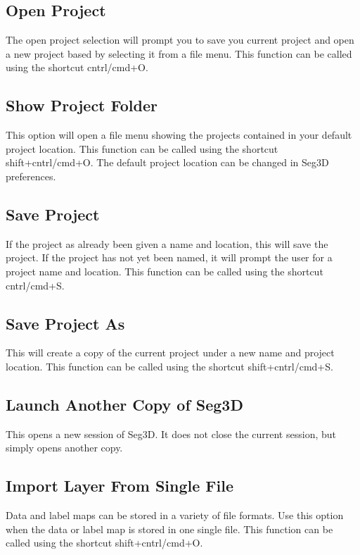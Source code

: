 \documentclass[fleqn,11pt,openany]{book}
\begin{document}
\subsection{Open Project}
\label{sec:openproject}
The open project selection will prompt you to save you current project and open a new project based by selecting it from a file menu.  This function can be called using the shortcut cntrl/cmd+O.

\subsection{Show Project Folder}
This option will open a file menu showing the projects contained in your default project location.  This function can be called using the shortcut shift+cntrl/cmd+O.  The default project location can be changed in Seg3D preferences.

\subsection{Save Project}
If the project as already been given a name and location, this will save the project.  If the project has not yet been named, it will prompt the user for a project name and location.  This function can be called using the shortcut cntrl/cmd+S.

\subsection{Save Project As}
\label{sec:saveprojectas}
This will create a copy of the current project under a new name and project location.  This function can be called using the shortcut shift+cntrl/cmd+S.

\subsection{Launch Another Copy of Seg3D}
This opens a new session of Seg3D.  It does not close the current session, but simply opens another copy.

\subsection{Import Layer From Single File}
\label{sec:importsinglefile}
Data and label maps can be stored in a variety of file formats.  Use this option when the data or label map is stored in one single file.  This function can be called using the shortcut shift+cntrl/cmd+O.
\end{document}

